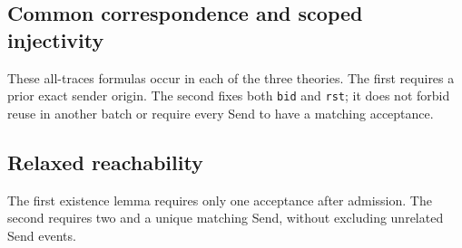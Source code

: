 \medskip
\noindent\begin{minipage}{\linewidth}
\subsection{Common correspondence and scoped injectivity}
These all-traces formulas occur in each of the three theories. The first
requires a prior exact sender origin. The second fixes both \texttt{bid} and
\texttt{rst}; it does not forbid reuse in another batch or require every Send
to have a matching acceptance.

\end{minipage}\par\medskip
\noindent\begin{minipage}{\linewidth}

\end{minipage}\par\medskip

\noindent\begin{minipage}{\linewidth}
\subsection{Relaxed reachability}
The first existence lemma requires only one acceptance after admission. The
second requires two and a unique matching Send, without excluding unrelated
Send events.

\end{minipage}\par\medskip
\noindent\begin{minipage}{\linewidth}

\end{minipage}\par\medskip

